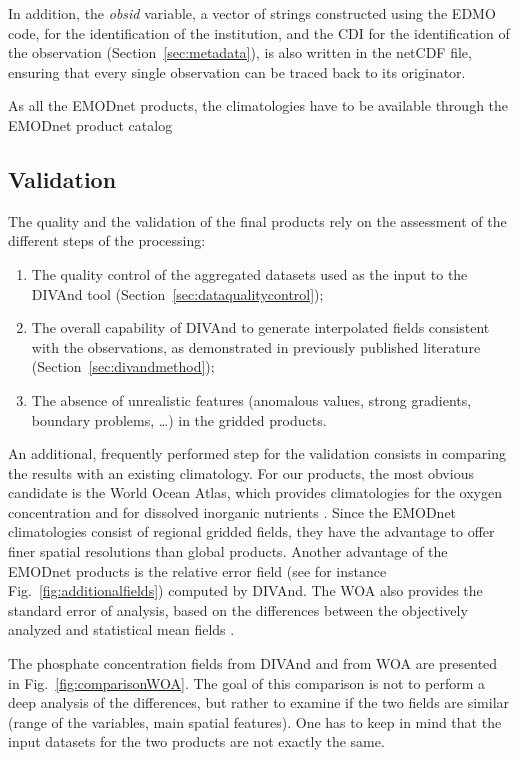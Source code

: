 \documentclass[essd,manuscript]{copernicus}
\begin{document}
In addition, the \textit{obsid} variable, a vector of strings constructed using the EDMO code, for the identification of the institution, and the CDI for the identification of the observation (Section~\ref{sec:metadata}), is also written in the netCDF file, ensuring that every single observation can be traced back to its originator.

As all the EMODnet products, the climatologies have to be available through the EMODnet product catalog \citep[][https://emodnet.ec.europa.eu/en]{BEJA2024}

\subsection{Validation}

The quality and the validation of the final products rely on the assessment of the different steps of the processing:
\begin{enumerate}
\item The quality control of the aggregated datasets used as the input to the DIVAnd tool (Section~\ref{sec:dataqualitycontrol});
\item The overall capability of DIVAnd to generate interpolated fields consistent with the observations, as demonstrated in previously published literature (Section~\ref{sec:divandmethod});
\item The absence of unrealistic features (anomalous values, strong gradients, boundary problems, \ldots) in the gridded products.
\end{enumerate}

An additional, frequently performed step for the validation consists in comparing the results with an existing climatology. For our products, the most obvious candidate is the World Ocean Atlas, which provides climatologies for the oxygen concentration \citep{Garcia2024} and for dissolved inorganic nutrients \citep{Garcia2024b}. Since the EMODnet climatologies consist of regional gridded fields, they have the advantage to offer finer spatial resolutions than global products. Another advantage of the EMODnet products is the relative error field (see for instance Fig.~\ref{fig:additionalfields}) computed by DIVAnd. The WOA also provides the standard error of analysis, based on the differences between the objectively analyzed and statistical mean fields \citep{Levitus2012}.

The phosphate concentration fields from DIVAnd and from WOA are presented in Fig.~\ref{fig:comparisonWOA}. The goal of this comparison is not to perform a deep analysis of the differences, but rather to examine if the two fields are similar (range of the variables, main spatial features). One has to keep in mind that the input datasets for the two products are not exactly the same. 
\end{document}
